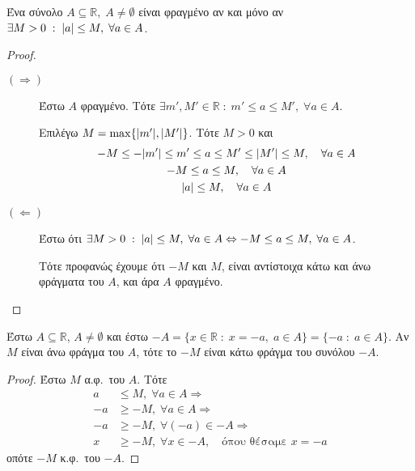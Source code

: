 \begin{mybox3}
\begin{prop}
  Ένα σύνολο $ A \subseteq \mathbb{R}, \; A \neq \emptyset $ είναι 
  φραγμένο αν και μόνο αν $ \exists M>0 \; : \; \abs{a} \leq M, \; 
  \forall a \in A$.
\end{prop}
\end{mybox3}
\begin{proof}
\item {}
  \begin{description}
    \item [$ (\Rightarrow) $] Έστω $A$ φραγμένο. Τότε 
      $ \exists m',M' \in \mathbb{R} \; : \; m' \leq a \leq M', \; 
      \forall a \in A $.

      Επιλέγω $ M = \max \{ \abs{m'}, \abs{M'} \} $. Τότε $ M >0 $ και 
      \begin{gather*}
        -M \leq - \abs{m'} \leq m' \leq a \leq M' \leq \abs{M'} 
        \leq M, \quad \forall a \in A \\
        -M \leq a \leq M, \quad \forall a \in A \\
        \abs{a} \leq M, \quad \forall a \in A
      \end{gather*}

    \item [$ (\Leftarrow) $]
      Έστω ότι $ \exists M>0 \; : \; \abs{a} \leq M, \; \forall a \in 
      A \Leftrightarrow -M \leq a \leq M, \; \forall a \in A$. 

      Τότε προφανώς έχουμε ότι $-M $ και $ M $, 
      είναι αντίστοιχα κάτω  και άνω  φράγματα του $A$, και άρα $A$ 
      φραγμένο.
  \end{description} 
\end{proof}

\begin{mybox3}
\begin{prop}
  Έστω $ A \subseteq \mathbb{R}$, $A \neq \emptyset $ και έστω 
  $ -A = \{ x \in \mathbb{R} \; : \; x = -a, \; a \in A \} = \{ 
  -a \; : \; a \in A\} $. Αν $M$ είναι άνω φράγμα 
  του $A$, τότε το $ -M $ είναι κάτω φράγμα του συνόλου $ -A $.
\end{prop}
\end{mybox3}
\begin{proof}
  Έστω $M$ α.φ.\ του $A$. Τότε 
  \begin{align*}
    a &\leq M, \; \forall a \in A \Rightarrow  \\
    -a &\geq -M, \; \forall a \in A \Rightarrow \\
    -a &\geq -M, \; \forall (-a) \in -A \Rightarrow \\
    x &\geq -M, \; \forall x \in -A, \quad \text{όπου θέσαμε } x=-a 
  \end{align*}
  οπότε $ -M $  κ.φ.\ του $ -A $.
\end{proof}

